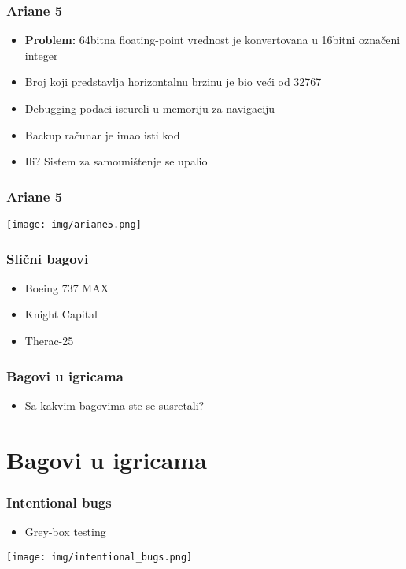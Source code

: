 \documentclass{beamer}
\begin{document}
\begin{frame}
    \frametitle{Ariane  5}
    \begin{itemize}
        \item \textbf{Problem:} 64bitna floating-point vrednost je konvertovana u 16bitni označeni integer \newline
        \item Broj koji predstavlja horizontalnu brzinu je bio veći od 32767 \newline
        \item Debugging podaci iscureli u memoriju za navigaciju \newline
        \item Backup računar je imao isti kod \newline
        \item Ili? Sistem za samouništenje se upalio
    \end{itemize}
\end{frame}

\begin{frame}
    \frametitle{Ariane 5}
    \begin{center}
        \texttt{[image: img/ariane5.png]}
    \end{center}
\end{frame}

\begin{frame}
    \frametitle{Slični bagovi}
    \begin{itemize}
        \item Boeing 737 MAX \newline
        \item Knight Capital \newline
        \item Therac-25 \newline
    \end{itemize}
\end{frame}

\begin{frame}
    \frametitle{Bagovi u igricama}
    \begin{itemize}
        \item Sa kakvim bagovima ste se susretali?
    \end{itemize}
\end{frame}

\section{Bagovi u igricama}
\begin{frame}
    \frametitle{Intentional bugs}
    \begin{itemize}
        \item Grey-box testing \newline
    \end{itemize}
    \begin{center}
        \texttt{[image: img/intentional\_bugs.png]}
    \end{center}
\end{frame}
\end{document}
